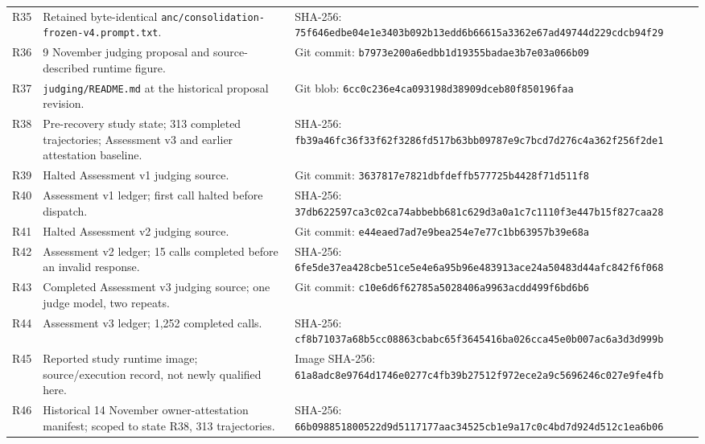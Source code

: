 \documentclass[11pt,a4paper]{article}
\begin{document}
\begin{longtable}{@{}L{0.7cm}L{6.2cm}L{8.1cm}@{}}
\label{prov:R35}R35 & Retained byte-identical \nolinkurl{anc/consolidation-frozen-v4.prompt.txt}. & SHA-256: \nolinkurl{75f646edbe04e1e3403b092b13edd6b66615a3362e67ad49744d229cdcb94f29} \\
\label{prov:R36}R36 & 9 November judging proposal and source-described runtime figure. & Git commit: \nolinkurl{b7973e200a6edbb1d19355badae3b7e03a066b09} \\
\label{prov:R37}R37 & \nolinkurl{judging/README.md} at the historical proposal revision. & Git blob: \nolinkurl{6cc0c236e4ca093198d38909dceb80f850196faa} \\
\label{prov:R38}R38 & Pre-recovery study state; 313 completed trajectories; Assessment v3 and earlier attestation baseline. & SHA-256: \nolinkurl{fb39a46fc36f33f62f3286fd517b63bb09787e9c7bcd7d276c4a362f256f2de1} \\
\label{prov:R39}R39 & Halted Assessment v1 judging source. & Git commit: \nolinkurl{3637817e7821dbfdeffb577725b4428f71d511f8} \\
\label{prov:R40}R40 & Assessment v1 ledger; first call halted before dispatch. & SHA-256: \nolinkurl{37db622597ca3c02ca74abbebb681c629d3a0a1c7c1110f3e447b15f827caa28} \\
\label{prov:R41}R41 & Halted Assessment v2 judging source. & Git commit: \nolinkurl{e44eaed7ad7e9bea254e7e77c1bb63957b39e68a} \\
\label{prov:R42}R42 & Assessment v2 ledger; 15 calls completed before an invalid response. & SHA-256: \nolinkurl{6fe5de37ea428cbe51ce5e4e6a95b96e483913ace24a50483d44afc842f6f068} \\
\label{prov:R43}R43 & Completed Assessment v3 judging source; one judge model, two repeats. & Git commit: \nolinkurl{c10e6d6f62785a5028406a9963acdd499f6bd6b6} \\
\label{prov:R44}R44 & Assessment v3 ledger; 1,252 completed calls. & SHA-256: \nolinkurl{cf8b71037a68b5cc08863cbabc65f3645416ba026cca45e0b007ac6a3d3d999b} \\
\label{prov:R45}R45 & Reported study runtime image; source/execution record, not newly qualified here. & Image SHA-256: \nolinkurl{61a8adc8e9764d1746e0277c4fb39b27512f972ece2a9c5696246c027e9fe4fb} \\
\label{prov:R46}R46 & Historical 14 November owner-attestation manifest; scoped to state R38, 313 trajectories. & SHA-256: \nolinkurl{66b098851800522d9d5117177aac34525cb1e9a17c0c4bd7d924d512c1ea6b06} \\

\end{longtable}
\end{document}
